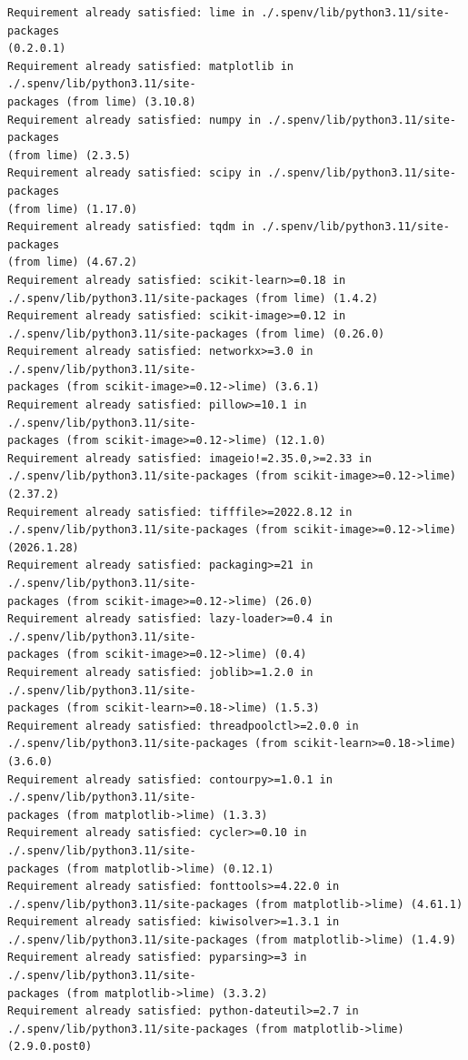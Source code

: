 \documentclass[9pt]{article}
\begin{document}
    \begin{Verbatim}[commandchars=\\\{\}]
Requirement already satisfied: lime in ./.spenv/lib/python3.11/site-packages
(0.2.0.1)
Requirement already satisfied: matplotlib in ./.spenv/lib/python3.11/site-
packages (from lime) (3.10.8)
Requirement already satisfied: numpy in ./.spenv/lib/python3.11/site-packages
(from lime) (2.3.5)
Requirement already satisfied: scipy in ./.spenv/lib/python3.11/site-packages
(from lime) (1.17.0)
Requirement already satisfied: tqdm in ./.spenv/lib/python3.11/site-packages
(from lime) (4.67.2)
Requirement already satisfied: scikit-learn>=0.18 in
./.spenv/lib/python3.11/site-packages (from lime) (1.4.2)
Requirement already satisfied: scikit-image>=0.12 in
./.spenv/lib/python3.11/site-packages (from lime) (0.26.0)
Requirement already satisfied: networkx>=3.0 in ./.spenv/lib/python3.11/site-
packages (from scikit-image>=0.12->lime) (3.6.1)
Requirement already satisfied: pillow>=10.1 in ./.spenv/lib/python3.11/site-
packages (from scikit-image>=0.12->lime) (12.1.0)
Requirement already satisfied: imageio!=2.35.0,>=2.33 in
./.spenv/lib/python3.11/site-packages (from scikit-image>=0.12->lime) (2.37.2)
Requirement already satisfied: tifffile>=2022.8.12 in
./.spenv/lib/python3.11/site-packages (from scikit-image>=0.12->lime)
(2026.1.28)
Requirement already satisfied: packaging>=21 in ./.spenv/lib/python3.11/site-
packages (from scikit-image>=0.12->lime) (26.0)
Requirement already satisfied: lazy-loader>=0.4 in ./.spenv/lib/python3.11/site-
packages (from scikit-image>=0.12->lime) (0.4)
Requirement already satisfied: joblib>=1.2.0 in ./.spenv/lib/python3.11/site-
packages (from scikit-learn>=0.18->lime) (1.5.3)
Requirement already satisfied: threadpoolctl>=2.0.0 in
./.spenv/lib/python3.11/site-packages (from scikit-learn>=0.18->lime) (3.6.0)
Requirement already satisfied: contourpy>=1.0.1 in ./.spenv/lib/python3.11/site-
packages (from matplotlib->lime) (1.3.3)
Requirement already satisfied: cycler>=0.10 in ./.spenv/lib/python3.11/site-
packages (from matplotlib->lime) (0.12.1)
Requirement already satisfied: fonttools>=4.22.0 in
./.spenv/lib/python3.11/site-packages (from matplotlib->lime) (4.61.1)
Requirement already satisfied: kiwisolver>=1.3.1 in
./.spenv/lib/python3.11/site-packages (from matplotlib->lime) (1.4.9)
Requirement already satisfied: pyparsing>=3 in ./.spenv/lib/python3.11/site-
packages (from matplotlib->lime) (3.3.2)
Requirement already satisfied: python-dateutil>=2.7 in
./.spenv/lib/python3.11/site-packages (from matplotlib->lime) (2.9.0.post0)

\end{Verbatim}
\end{document}
